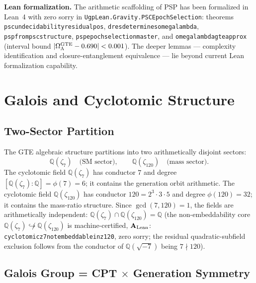 \documentclass[11pt]{article}
\theoremstyle{remark}
\newcommand{\lean}[1]{%
  \penalty-100
  \begingroup\def\_{\textunderscore\allowbreak}\texttt{#1}\endgroup}
\newcommand{\Omegalam}{\Omega_\Lambda}
\newcommand{\CatAL}{\ensuremath{\textbf{A}_{\rm Lean}}}
\begin{document}
\smallskip\noindent\textbf{Lean formalization.}
The arithmetic scaffolding of PSP has been formalized in Lean~4 with zero sorry in
\texttt{UgpLean.Gravity.PSCEpochSelection}: theorems
\lean{psc\_undecidability\_residual\_pos},
\lean{d\_res\_determines\_omega\_lambda},
\lean{psp\_from\_psc\_structure},
\lean{psp\_epoch\_selection\_master}, and
\lean{omega\_lambda\_gte\_approx} (interval bound $|\Omegalam^{\rm GTE}-0.690|<0.001$).
The deeper lemmas --- complexity identification
and closure-entanglement equivalence --- lie beyond current Lean formalization capability.

\section{Galois and Cyclotomic Structure}
\label{sec:galois}

\subsection{Two-Sector Partition}
\label{sec:two_sectors}

The GTE algebraic structure partitions into two arithmetically disjoint sectors:
\begin{equation}
  \mathbb{Q}(\zeta_7) \quad\text{(SM sector)},\qquad
  \mathbb{Q}(\zeta_{120}) \quad\text{(mass sector)}.
\end{equation}
The cyclotomic field $\mathbb{Q}(\zeta_7)$ has conductor $7$ and degree
$[\mathbb{Q}(\zeta_7):\mathbb{Q}] = \phi(7) = 6$; it contains the generation orbit
arithmetic.  The cyclotomic field $\mathbb{Q}(\zeta_{120})$ has conductor $120 = 2^3\cdot
3\cdot 5$ and degree $\phi(120)=32$; it contains the mass-ratio structure.  Since $\gcd(7,120)=1$,
the fields are arithmetically independent:
$\mathbb{Q}(\zeta_7)\cap\mathbb{Q}(\zeta_{120}) = \mathbb{Q}$ (the non-embeddability
core $\mathbb{Q}(\zeta_7) \not\hookrightarrow \mathbb{Q}(\zeta_{120})$ is
machine-certified, $\CatAL$: \lean{cyclotomic\_z7\_not\allowbreak\_embeddable\_in\_z120},
zero sorry; the residual quadratic-subfield exclusion follows from the conductor
of $\mathbb{Q}(\sqrt{-7})$ being $7 \nmid 120$).

\subsection{Galois Group = CPT $\times$ Generation Symmetry}
\label{sec:galois_cpt}
\end{document}
